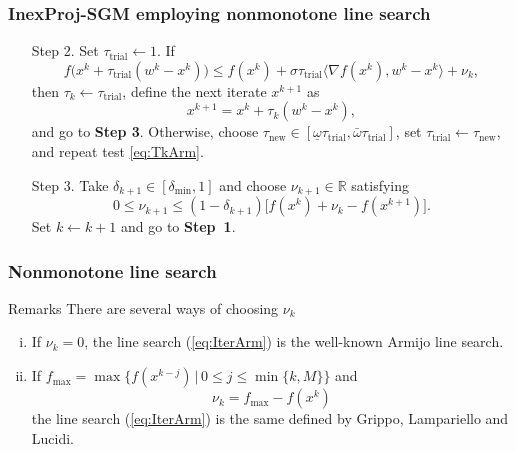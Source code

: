 \begingroup
\small
\begin{frame}[t]
  \frametitle{InexProj-SGM employing nonmonotone line search}

  \begin{enumerate}
    \item[Step 2.] Set $\tau_{\textrm{trial}} \gets 1$. If
    \begin{equation}\label{eq:TkArm}
       f\Big(x^{k}+ \tau_{\textrm{trial}}(w^k - x^{k})\Big) \leq f(x^{k}) + \sigma \tau_{\textrm{trial}}\Big\langle \nabla f(x^{k}), w^k - x^{k} \Big\rangle + \nu_k,
    \end{equation}
    then  $\tau_k\gets \tau_{\textrm{trial}}$, define the next iterate $x^{k+1}$ as
    \begin{equation} \label{eq:IterArm}
      x^{k+1} = x^{k} + \tau_k (w^k - x^{k}),
    \end{equation}
    and go to {\bf Step 3}. Otherwise, choose $\tau_{\textrm{new}} \in [\underline\omega \tau_{\textrm{trial}}, \bar\omega \tau_{\textrm{trial}} ]$, set $\tau_{\textrm{trial}} \gets \tau_{\textrm{new}}$, and repeat test \eqref{eq:TkArm}.
    
    \item [Step 3.] Take  $\delta_{k+1}\in [\delta_{\min}, 1]$ and choose    $\nu_{k+1}\in {\mathbb R}$ satisfying
    \begin{equation*} 
      0\leq \nu_{k+1}\leq (1-\delta_{k+1})\Big[f(x^{k})+\nu_{k}-f(x^{k+1})\Big].
    \end{equation*}
    Set $k\gets k+1$ and go to \textbf{Step~1}.
  \end{enumerate}
\end{frame}
\endgroup

\begin{frame}[t]\frametitle{Nonmonotone line search}
  \begin{block}{Remarks}
  There are several ways of choosing $\nu_k$
    \begin{enumerate}[(i)]
      \item If $\nu_k = 0$, the line search (\ref{eq:IterArm}) is the well-known Armijo line search.
      \item If $f_{\max} = \max\{f(x^{k-j})\, | \, 0\leq j\leq \min\{k,M\}\}$ and
            \begin{equation}\label{eq:nuGLL}
              \nu_k = f_{\max} - f(x^k)
            \end{equation}
            the line search (\ref{eq:IterArm}) is the same defined by Grippo, Lampariello and Lucidi.
    \end{enumerate}
  \end{block}
\end{frame}

